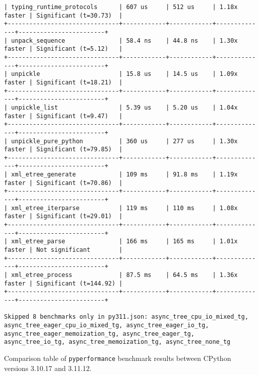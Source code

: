 \begin{code}
\begin{verbatim}
| typing_runtime_protocols      | 607 us     | 512 us     | 1.18x faster | Significant (t=30.73)  |
+-------------------------------+------------+------------+--------------+------------------------+
| unpack_sequence               | 58.4 ns    | 44.8 ns    | 1.30x faster | Significant (t=5.12)   |
+-------------------------------+------------+------------+--------------+------------------------+
| unpickle                      | 15.8 us    | 14.5 us    | 1.09x faster | Significant (t=18.21)  |
+-------------------------------+------------+------------+--------------+------------------------+
| unpickle_list                 | 5.39 us    | 5.20 us    | 1.04x faster | Significant (t=9.47)   |
+-------------------------------+------------+------------+--------------+------------------------+
| unpickle_pure_python          | 360 us     | 277 us     | 1.30x faster | Significant (t=79.85)  |
+-------------------------------+------------+------------+--------------+------------------------+
| xml_etree_generate            | 109 ms     | 91.8 ms    | 1.19x faster | Significant (t=70.86)  |
+-------------------------------+------------+------------+--------------+------------------------+
| xml_etree_iterparse           | 119 ms     | 110 ms     | 1.08x faster | Significant (t=29.01)  |
+-------------------------------+------------+------------+--------------+------------------------+
| xml_etree_parse               | 166 ms     | 165 ms     | 1.01x faster | Not significant        |
+-------------------------------+------------+------------+--------------+------------------------+
| xml_etree_process             | 87.5 ms    | 64.5 ms    | 1.36x faster | Significant (t=144.92) |
+-------------------------------+------------+------------+--------------+------------------------+

Skipped 8 benchmarks only in py311.json: async_tree_cpu_io_mixed_tg, async_tree_eager_cpu_io_mixed_tg, async_tree_eager_io_tg, async_tree_eager_memoization_tg, async_tree_eager_tg, async_tree_io_tg, async_tree_memoization_tg, async_tree_none_tg
    \end{verbatim}
    \caption{Comparison table of \texttt{pyperformance} benchmark results between CPython versions 3.10.17 and 3.11.12.}
    \label{listing:pyperformance-results-310-311}
\end{code}

